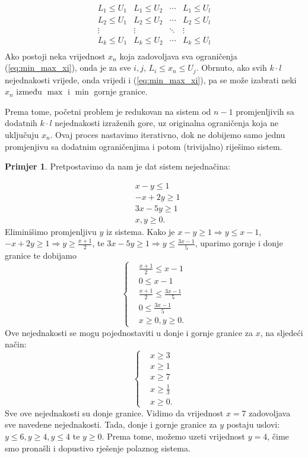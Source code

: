 \documentclass[a4paper, utf8, 11pt, colorlinks]{book}
\theoremstyle{definition}
\newtheorem{primjer}{Primjer}[chapter]
\begin{document}
 $$\begin{array}{cccc}
       L_1 \leq U_1 & L_1 \leq U_2   &  \cdots   & L_1 \leq U_l \\
       L_2 \leq U_1 & L_2  \leq U_2  &  \cdots   & L_2 \leq U_l \\
       \vdots       &     \vdots     &   \ddots  & \vdots       \\
       L_k \leq U_1 &  L_k \leq U_2  &   \cdots  & L_k \leq U_l \\
 \end{array}$$ 
Ako postoji neka vrijednost  $x_n$ koja zadovoljava sva ograničenja (\ref{eq:min_max_xi}), onda je za sve $i,j$, 
$L_i \leq x_n \leq U_j$. Obrnuto, ako svih $k \cdot l$ nejednakosti vrijede, onda vrijedi i (\ref{eq:min_max_xi}), pa se može izabrati neki $x_n$ između $\max$ i $\min$ gornje granice. 

Prema tome, početni problem je redukovan na sistem od $n-1$ promjenljivih sa dodatnih  $k \cdot l$ nejednakosti izraženih gore, uz originalna ograničenja koja ne uključuju $x_n$. Ovaj proces nastavimo iterativno, dok ne dobijemo samo jednu promjenjivu sa dodatnim ograničenjima  i potom (trivijalno) riješimo sistem. 

\begin{primjer} Pretpostavimo da nam je dat sistem nejednačina:
	\end{primjer}
\begin{align*}
	 &x - y \leq 1 \\
	 &-x + 2y \geq 1 \\
	 & 3x - 5y \geq 1 \\
	 & x,y \geq 0.
\end{align*}
Eliminišimo promjenljivu $y$ iz sistema. Kako je $x-y \geq 1 \Rightarrow y \leq x -1 $, 
$-x + 2y \geq 1 \Rightarrow y \geq \frac{x+1}{2}$, te $ 3x - 5y \geq 1 \Rightarrow y \leq \frac{3x-1}{5}$, uparimo gornje i donje granice te dobijamo 
 $$
 \begin{cases}
 	&\frac{x+1}{2} \leq x-1 \\
 	& 0 \leq x-1 \\
 	& \frac{x+1}{2} \leq \frac{3x-1}{5} \\
 	& 0 \leq \frac{3x-1}{5} \\
 	& x \geq 0, y \geq 0.  	
 \end{cases}
 $$
Ove nejednakosti se mogu pojednostaviti u donje i gornje granice za $x$, na sljedeći način:
$$
\begin{cases}
    &x \geq 3 \\
    & x \geq 1 \\
    & x \geq 7 \\
    & x \geq \frac{1}{3} \\
    & x \geq 0.	
\end{cases}
$$
Sve ove nejednakosti su donje granice. Vidimo da vrijednost $x=7$ zadovoljava sve navedene nejednakosti.
Tada, donje i gornje granice za $y$ postaju uslovi: $y \leq 6, y \geq 4, y \leq 4$ te $y \geq 0$. Prema tome, možemo uzeti vrijednost $y=4$, čime smo pronašli i dopustivo rješenje polaznog sistema. 
\vspace{1.5cm}
\end{document}
